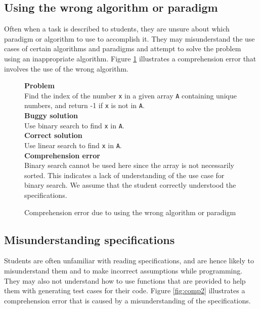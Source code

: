 \documentclass{sig-alternate}
\begin{document}
\subsection{Using the wrong algorithm or paradigm}
\label{sec:comp1}
Often when a task is described to students, they are unsure about which paradigm or algorithm to use to accomplish it. They may misunderstand the use cases of certain algorithms and paradigms and attempt to solve the problem using an inappropriate algorithm. Figure \ref{fig:comp1} illustrates a comprehension error that involves the use of the wrong algorithm.

\begin{figure}
\begin{framed}
\setlength{\parindent}{0cm}
\textbf{Problem} \\
Find the index of the number \texttt{x} in a given array \texttt{A} containing unique numbers, and return -1 if \texttt{x} is not in \texttt{A}.\\

\textbf{Buggy solution} \\
Use binary search to find \texttt{x} in \texttt{A}.\\

\textbf{Correct solution}\\
Use linear search to find \texttt{x} in \texttt{A}.\\

\textbf{Comprehension error}\\
Binary search cannot be used here since the array is not necessarily sorted. This indicates a lack of understanding of the use case for binary search. We assume that the student correctly understood the specifications.
\end{framed}
\caption{Comprehension error due to using the wrong algorithm or paradigm}
\label{fig:comp1}
\end{figure}

\subsection{Misunderstanding specifications}
\label{sec:comp2}
Students are often unfamiliar with reading specifications, and are hence likely to misunderstand them and to make incorrect assumptions while programming. They may also not understand how to use functions that are provided to help them with generating test cases for their code. Figure \ref{fig:comp2} illustrates a comprehension error that is caused by a misunderstanding of the specifications.\\
\end{document}
